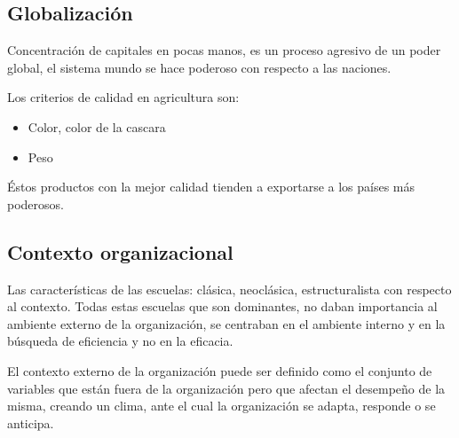 
\subsection{Globalización}
\begin{definition}[Globalización]
    Concentración de capitales en pocas manos, es un proceso agresivo de un poder global, el sistema mundo se hace poderoso con respecto a las naciones.
\end{definition}
Los criterios de calidad en agricultura son:
\begin{itemize}
    \item Color, color de la cascara
    \item Peso
\end{itemize}
Éstos productos con la mejor calidad tienden a exportarse a los países más poderosos.
\subsection{Contexto organizacional}

Las características de las escuelas: clásica, neoclásica, estructuralista con respecto al contexto. Todas estas escuelas que son dominantes, no daban importancia al ambiente externo de la organización, se centraban en el ambiente interno y en la búsqueda de eficiencia y no en la eficacia.

El contexto externo de la organización puede ser definido como el conjunto de variables que están fuera de la organización pero que afectan el desempeño de la misma, creando un clima, ante el cual la organización se adapta, responde o se anticipa.
\begin{center}
\end{center}
\begin{center}
\end{center}

